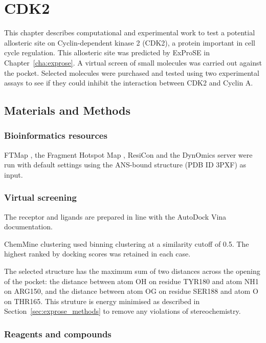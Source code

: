 \chapter{CDK2}
\label{cha:cdk2}

This chapter describes computational and experimental work to test a potential allosteric site on Cyclin-dependent kinase 2 (CDK2), a protein important in cell cycle regulation.
This allosteric site was predicted by ExProSE in Chapter~\ref{cha:exprose}.
A virtual screen of small molecules was carried out against the pocket.
Selected molecules were purchased and tested using two experimental assays to see if they could inhibit the interaction between CDK2 and Cyclin A.


\section{Materials and Methods}
\label{sec:cdk2_methods}


\subsection{Bioinformatics resources}

FTMap \cite{Kozakov2015}, the Fragment Hotspot Map \cite{Radoux2016}, ResiCon \cite{Dziubinski2016} and the DynOmics server \cite{Li2017} were run with default settings using the ANS-bound structure (PDB ID 3PXF) as input.


\subsection{Virtual screening}

The receptor and ligands are prepared in line with the AutoDock Vina documentation.

ChemMine clustering used binning clustering at a similarity cutoff of 0.5.
The highest ranked by docking scores was retained in each case.

The selected structure has the maximum sum of two distances across the opening of the pocket: the distance between atom OH on residue TYR180 and atom NH1 on ARG150, and the distance between atom OG on residue SER188 and atom O on THR165.
This struture is energy minimised as described in Section~\ref{sec:exprose_methods} to remove any violations of stereochemistry.


\subsection{Reagents and compounds}

